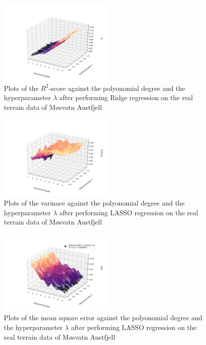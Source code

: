 \documentclass[a4paper,10pt,english]{article}
\begin{document}
\begin{figure}[H]
	\centering 
	\includegraphics[width = 0.5\textwidth, center]{../real_output/part_D_3.png}
	\caption{
		Plots of the $R^2$-score against the polyonomial degree and the hyperparameter $\lambda$ after performing Ridge regression on the real terrain data of Møsvatn Austfjell
	}
	\label{part_g_d3}
\end{figure}



\begin{figure}[H]
	\centering 
	\includegraphics[width = 0.5\textwidth, center]{../real_output/part_E_1.png}
	\caption{
		Plots of the varinace against the polyonomial degree and the hyperparameter $\lambda$ after performing LASSO regression on the real terrain data of Møsvatn Austfjell
	}
	\label{part_g_e1}
\end{figure}

\begin{figure}[H]
	\centering 
	\includegraphics[width = 0.5\textwidth, center]{../real_output/part_E_2.png}
	\caption{
		Plots of the mean square error against the polyonomial degree and the hyperparameter $\lambda$ after performing LASSO regression on the real terrain data of Møsvatn Austfjell 
	}
	\label{part_g_e2}
\end{figure}
\end{document}
